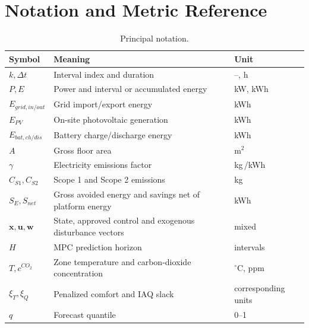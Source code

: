 \section{Notation and Metric Reference}

\begin{table}[h]
	\centering
	\caption{Principal notation.}
	\label{tab:notation}
	\begin{tabularx}{\textwidth}{p{}p{}X}
		\toprule
		Symbol                 & Meaning                                                   & Unit                \\
		\midrule
		$k,\Delta t$           & Interval index and duration                               & --, h               \\
		$P,E$                  & Power and interval or accumulated energy                  & kW, kWh             \\
		$E_{grid,in/out}$      & Grid import/export energy                                 & kWh                 \\
		$E_{PV}$               & On-site photovoltaic generation                           & kWh                 \\
		$E_{bat,ch/dis}$       & Battery charge/discharge energy                           & kWh                 \\
		$A$                    & Gross floor area                                          & m$^2$               \\
		$\gamma$               & Electricity emissions factor                              & kg\,\COtwoe/kWh     \\
		$C_{S1},C_{S2}$        & Scope 1 and Scope 2 emissions                             & kg\,\COtwoe         \\
		$S_E,S_{net}$          & Gross avoided energy and savings net of platform energy   & kWh                 \\
		$\bm{x},\bm{u},\bm{w}$ & State, approved control and exogenous disturbance vectors & mixed               \\
		$H$                    & MPC prediction horizon                                    & intervals           \\
		$T,c^{CO_2}$           & Zone temperature and carbon-dioxide concentration         & $^\circ$C, ppm      \\
		$\xi_T,\xi_Q$          & Penalized comfort and IAQ slack                           & corresponding units \\
		$q$                    & Forecast quantile                                         & 0--1                \\

\end{tabularx}
\end{table}
